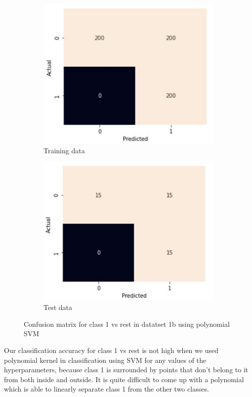 \documentclass[11pt]{article}
\begin{document}
\begin{figure}[h]
\centering
	\begin{subfigure}[b]{0.45\textwidth}
	\centering
	\includegraphics[scale=0.5]{dataset1b_poly_svm_1_cm_train.jpg}
	\caption{Training data}
	\label{fig:fig2.2.2.1}
	\end{subfigure}
	\begin{subfigure}[b]{0.45\textwidth}
	\centering
	\includegraphics[scale=0.5]{dataset1b_poly_svm_1_cm_test.jpg}
	\caption{Test data}
	\label{fig:fig2.2.2.2}
	\end{subfigure}
\caption{Confusion matrix for class 1 vs rest in datatset 1b using polynomial SVM}
\label{fig:fig2.2.2}
\end{figure}

Our classification accuracy for class 1 vs rest is not high when we used polynomial kernel in classification using SVM for any values of the hyperparameters, because class 1 is surrounded by points that don't belong to it from both inside and outside. It is quite difficult to come up with a polynomial which is able to linearly separate class 1 from the other two classes.
  
\end{document}
